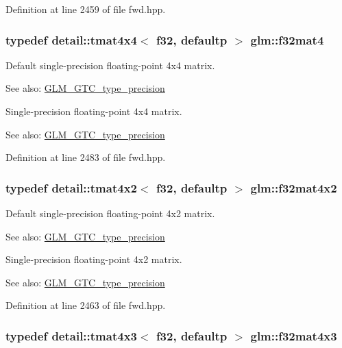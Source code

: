 Definition at line 2459 of file fwd.hpp.\hypertarget{group__gtc__type__precision_g6bf98d2ab0eb4889e5190c26e1853292}{
\subsubsection[f32mat4]{\setlength{\rightskip}{0pt plus 5cm}typedef detail::tmat4x4$<$ f32, defaultp $>$ {\bf glm::f32mat4}}}
\label{group__gtc__type__precision_g6bf98d2ab0eb4889e5190c26e1853292}


Default single-precision floating-point 4x4 matrix. \begin{Desc}
\item[See also:]\hyperlink{group__gtc__type__precision}{GLM\_\-GTC\_\-type\_\-precision}\end{Desc}
Single-precision floating-point 4x4 matrix. \begin{Desc}
\item[See also:]\hyperlink{group__gtc__type__precision}{GLM\_\-GTC\_\-type\_\-precision} \end{Desc}


Definition at line 2483 of file fwd.hpp.\hypertarget{group__gtc__type__precision_g6aee56c6561190811699bfd2b1cd0d57}{
\subsubsection[f32mat4x2]{\setlength{\rightskip}{0pt plus 5cm}typedef detail::tmat4x2$<$ f32, defaultp $>$ {\bf glm::f32mat4x2}}}
\label{group__gtc__type__precision_g6aee56c6561190811699bfd2b1cd0d57}


Default single-precision floating-point 4x2 matrix. \begin{Desc}
\item[See also:]\hyperlink{group__gtc__type__precision}{GLM\_\-GTC\_\-type\_\-precision}\end{Desc}
Single-precision floating-point 4x2 matrix. \begin{Desc}
\item[See also:]\hyperlink{group__gtc__type__precision}{GLM\_\-GTC\_\-type\_\-precision} \end{Desc}


Definition at line 2463 of file fwd.hpp.\hypertarget{group__gtc__type__precision_g5102ae88531e072efe57e75354e10347}{
\subsubsection[f32mat4x3]{\setlength{\rightskip}{0pt plus 5cm}typedef detail::tmat4x3$<$ f32, defaultp $>$ {\bf glm::f32mat4x3}}}
\label{group__gtc__type__precision_g5102ae88531e072efe57e75354e10347}


